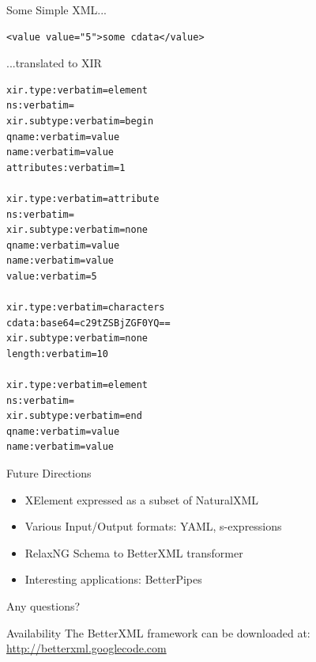 \documentclass{beamer}
\begin{document}
\begin{frame}[fragile]{Some Simple XML...}
\begin{lstlisting}
<value value="5">some cdata</value>
\end{lstlisting}
\end{frame}

\begin{frame}[fragile]{...translated to XIR}
\begin{lstlisting}
xir.type:verbatim=element
ns:verbatim=
xir.subtype:verbatim=begin
qname:verbatim=value
name:verbatim=value
attributes:verbatim=1

xir.type:verbatim=attribute
ns:verbatim=
xir.subtype:verbatim=none
qname:verbatim=value
name:verbatim=value
value:verbatim=5

xir.type:verbatim=characters
cdata:base64=c29tZSBjZGF0YQ==
xir.subtype:verbatim=none
length:verbatim=10

xir.type:verbatim=element
ns:verbatim=
xir.subtype:verbatim=end
qname:verbatim=value
name:verbatim=value
\end{lstlisting}
\end{frame}


\begin{frame}{Future Directions}
\begin{itemize}
  \item XElement expressed as a subset of NaturalXML
  \item Various Input/Output formats: YAML, s-expressions
  \item RelaxNG Schema to BetterXML transformer
  \item Interesting applications: BetterPipes
\end{itemize}
Any questions?
\end{frame}

\begin{frame}{Availability}
  The BetterXML framework can be downloaded at: \url{http://betterxml.googlecode.com}
\end{frame}
\end{document}
